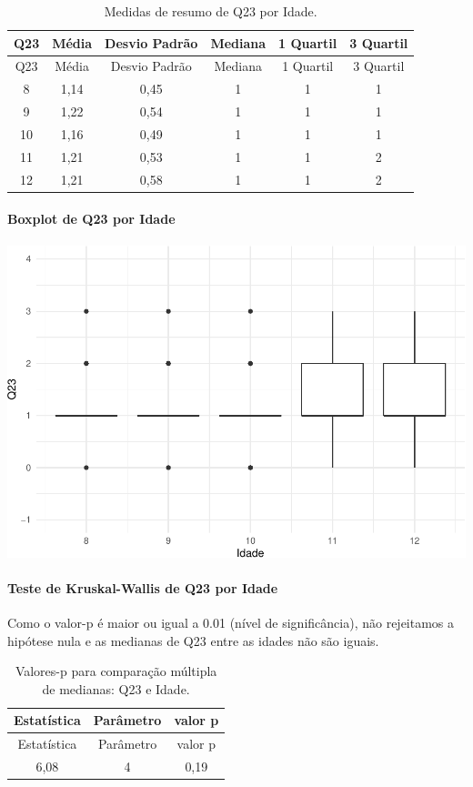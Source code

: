 \documentclass[]{article}
\let\oldparagraph\paragraph
\renewcommand{\paragraph}[1]{\oldparagraph{#1}\mbox{}}
\begin{document}
\begin{longtable}[]{@{}cccccc@{}}
\caption{\label{tab:unnamed-chunk-567}Medidas de resumo de Q23 por Idade.}\tabularnewline
\toprule
Q23 & Média & Desvio Padrão & Mediana & 1 Quartil & 3 Quartil\tabularnewline
\midrule
\endfirsthead
\toprule
Q23 & Média & Desvio Padrão & Mediana & 1 Quartil & 3 Quartil\tabularnewline
\midrule
\endhead
8 & 1,14 & 0,45 & 1 & 1 & 1\tabularnewline
9 & 1,22 & 0,54 & 1 & 1 & 1\tabularnewline
10 & 1,16 & 0,49 & 1 & 1 & 1\tabularnewline
11 & 1,21 & 0,53 & 1 & 1 & 2\tabularnewline
12 & 1,21 & 0,58 & 1 & 1 & 2\tabularnewline
\bottomrule
\end{longtable}

\hypertarget{boxplot-de-q23-por-idade}{%
\paragraph{Boxplot de Q23 por Idade}\label{boxplot-de-q23-por-idade}}

\begin{center}\includegraphics[width=0.75\linewidth]{relatorio_covid19_files/figure-latex/unnamed-chunk-568-1} \end{center}

\hypertarget{teste-de-kruskal-wallis-de-q23-por-idade}{%
\paragraph{Teste de Kruskal-Wallis de Q23 por Idade}\label{teste-de-kruskal-wallis-de-q23-por-idade}}

Como o valor-p é maior ou igual a 0.01 (nível de significância), não rejeitamos a hipótese nula e as medianas de Q23 entre as idades não são iguais.

\begin{longtable}[]{@{}ccc@{}}
\caption{\label{tab:unnamed-chunk-570}Valores-p para comparação múltipla de medianas: Q23 e Idade.}\tabularnewline
\toprule
Estatística & Parâmetro & valor p\tabularnewline
\midrule
\endfirsthead
\toprule
Estatística & Parâmetro & valor p\tabularnewline
\midrule
\endhead
6,08 & 4 & 0,19\tabularnewline
\bottomrule
\end{longtable}
\end{document}
